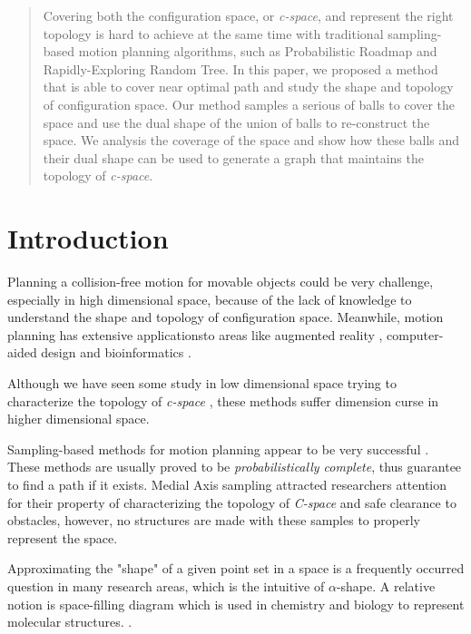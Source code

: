 \documentclass[11pt]{article}
\begin{document}
\maketitle

\begin{abstract}
Covering both the configuration space, or \emph{c-space}, and represent the right topology is hard to achieve at the same time with traditional sampling-based motion planning algorithms, such as Probabilistic Roadmap and Rapidly-Exploring Random Tree. In this paper, we proposed a method that is able to cover near optimal path and study the shape and topology of configuration space. Our method samples a serious of balls to cover the space and use the dual shape of the union of balls to re-construct the space. We analysis the coverage of the space and show how these balls and their dual shape can be used to generate a graph that maintains the topology of \emph{c-space}.
\end{abstract}

\section{Introduction}
\indent\indent Planning a collision-free motion for movable objects could be very challenge, especially in high dimensional space, because of the lack of knowledge to understand the shape and topology of configuration space. Meanwhile, motion planning has extensive applicationsto areas like augmented reality \cite{aug}, computer-aided design \cite{design} and bioinformatics \cite{bioinformatics}.

\indent Although we have seen some study in low dimensional space trying to characterize the topology of \emph{c-space} \cite{ConCompNum} \cite{interval}, these methods suffer dimension curse in higher dimensional space. 

\indent Sampling-based methods for motion planning appear to be very successful \cite{Book}. These methods are usually proved to be \emph{probabilistically complete}, thus guarantee to find a path if it exists. Medial Axis sampling \cite{MAPRM} \cite{UMAPRM} attracted researchers attention for their property of characterizing the topology of \emph{C-space} and safe clearance to obstacles, however, no structures are made with these samples to properly represent the space.  

\indent Approximating the "shape" of a given point set in a space is a frequently occurred question in many research areas, which is the intuitive of $\alpha$-shape. A relative notion is space-filling diagram which is used in chemistry and biology to represent molecular structures. \cite{alpha intro}. 
\end{document}
